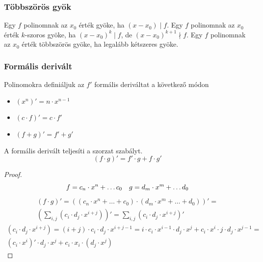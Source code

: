 \subsubsection{Többszörös gyök}
\begin{definition}
	Egy $f$ polinomnak az $x_0$ érték gyöke, ha $(x - x_0) \mid f$.
	Egy $f$ polinomnak az $x_0$ érték $k$-szoros gyöke,
	ha $(x - x_0)^k \mid f$, de $(x - x_0)^{k + 1} \nmid f$.
	Egy $f$ polinomnak az $x_0$ érték többszörös gyöke,
	ha legalább kétszeres gyöke.
\end{definition}
\subsubsection{Formális derivált}
\begin{definition}
	Polinomokra definiáljuk az $f'$ formális deriváltat a következő módon
	\begin{itemize}
		\item $(x^n)' = n \cdot x^{n - 1}$
		\item $(c \cdot f)' = c \cdot f'$
		\item $(f + g)' = f' + g'$
	\end{itemize}
\end{definition}
\begin{theorem}
	A formális derivált teljesíti a szorzat szabályt.
	\begin{equation*}
		(f \cdot g)' = f' \cdot g + f \cdot g'
	\end{equation*}
\end{theorem}
\begin{proof}
	\begin{equation*}
		f = c_n \cdot x^n + \dots c_0 \quad
		g = d_m \cdot x^m + \dots d_0 \\
	\end{equation*}
	\begin{multline*}
		(f \cdot g)' = \left( (c_n \cdot x^n + \dots + c_0) \cdot
		(d_m \cdot x^m + \dots + d_0) \right)' = \\
		\left( \sum_{i, j} (c_i \cdot d_j \cdot x^{i + j}) \right)' =
		\sum_{i, j} \left( c_i \cdot d_j \cdot x^{i + j} \right)'
	\end{multline*}
	\begin{multline*}
		(c_i \cdot d_j \cdot x^{i + j}) =
		(i + j) \cdot c_i \cdot d_j \cdot x^{i + j - 1} =
		i \cdot c_i \cdot x^{i - 1} \cdot d_j \cdot x^j +
		c_i \cdot x^i \cdot j \cdot d_j \cdot x^{j - 1} = \\
		(c_i \cdot x^i)' \cdot d_j \cdot x^j +
		c_i \cdot x_i \cdot (d_j \cdot x^j)
	\end{multline*}
\end{proof}
